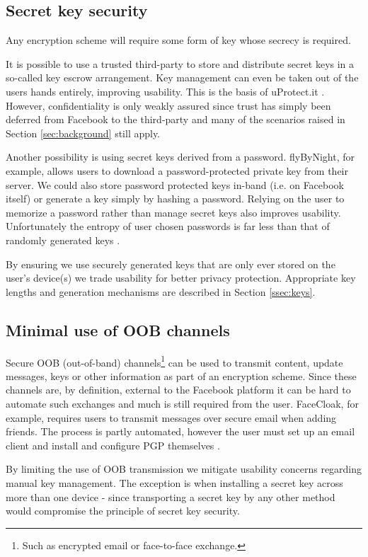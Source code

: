 \FloatBarrier
\subsection{Secret key security}

Any encryption scheme will require some form of key whose secrecy is required.

It is possible to use a trusted third-party to store and distribute secret keys in a so-called key escrow arrangement. Key management can even be taken out of the users hands entirely, improving usability. This is the basis of uProtect.it \cite{uprotect}. However, confidentiality is only weakly assured since trust has simply been deferred from Facebook to the third-party and many of the scenarios raised in Section \ref{sec:background} still apply.

Another possibility is using secret keys derived from a password. flyByNight, for example, allows users to download a password-protected private key from their server. We could also store password protected keys in-band (i.e. on Facebook itself) or generate a key simply by hashing a password. Relying on the user to memorize a password rather than manage secret keys also improves usability. Unfortunately the entropy of user chosen passwords is far less than that of randomly generated keys \cite{passwords}.

By ensuring we use securely generated keys that are only ever stored on the user's device(s) we trade usability for better privacy protection. Appropriate key lengths and generation mechanisms are described in Section \ref{ssec:keys}.


\FloatBarrier
\subsection{Minimal use of OOB channels}

Secure OOB (out-of-band) channels\footnote{Such as encrypted email or face-to-face exchange.} can be used to transmit content, update messages, keys or other information as part of an encryption scheme. Since these channels are, by definition, external to the Facebook platform it can be hard to automate such exchanges and much is still required from the user. FaceCloak, for example, requires users to transmit messages over secure email when adding friends. The process is partly automated, however the user must set up an email client and install and configure PGP themselves \cite{facecloak}.

By limiting the use of OOB transmission we mitigate usability concerns regarding manual key management. The exception is when installing a secret key across more than one device - since transporting a secret key by any other method would compromise the principle of secret key security.


